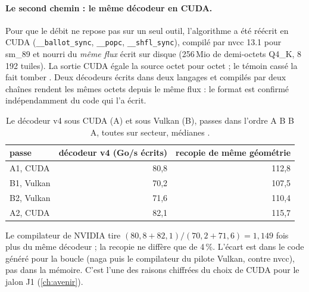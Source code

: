 \paragraph{Le second chemin : le même décodeur en CUDA.} Pour que le débit ne repose pas sur un seul outil, l'algorithme a été réécrit en CUDA (\texttt{\_\_ballot\_sync}, \texttt{\_\_popc}, \texttt{\_\_shfl\_sync}), compilé par nvcc 13.1 pour sm\_89 et nourri du \emph{même flux} écrit sur disque (256\,Mio de demi-octets Q4\_K, 8\,192 tuiles). La sortie CUDA égale la source octet pour octet ; le témoin cassé la fait tomber \mes. Deux décodeurs écrits dans deux langages et compilés par deux chaînes rendent les mêmes octets depuis le même flux : le format est confirmé indépendamment du code qui l'a écrit.

\begin{table}[ht]
\centering\small
\caption[Le décodeur v4 sous CUDA et sous Vulkan, en ABBA]{Le décodeur v4 sous CUDA (A) et sous Vulkan (B), passes dans l'ordre A B B A, toutes sur secteur, médianes \mes.}
\label{tab:ent-abba}
\begin{tabular}{@{}lrr@{}}
\toprule
passe & décodeur v4 (Go/s écrits) & recopie de même géométrie \\
\midrule
A1, CUDA & 80,8 & 112,8 \\
B1, Vulkan & 70,2 & 107,5 \\
B2, Vulkan & 71,6 & 110,4 \\
A2, CUDA & 82,1 & 115,7 \\
\bottomrule
\end{tabular}
\end{table}

Le compilateur de NVIDIA tire $(80{,}8 + 82{,}1)/(70{,}2 + 71{,}6) = 1{,}149$ fois plus du même décodeur \calc ; la recopie ne diffère que de 4\,\%. L'écart est dans le code généré pour la boucle (naga puis le compilateur du pilote Vulkan, contre nvcc), pas dans la mémoire. C'est l'une des raisons chiffrées du choix de CUDA pour le jalon J1 (\cref{ch:avenir}).

